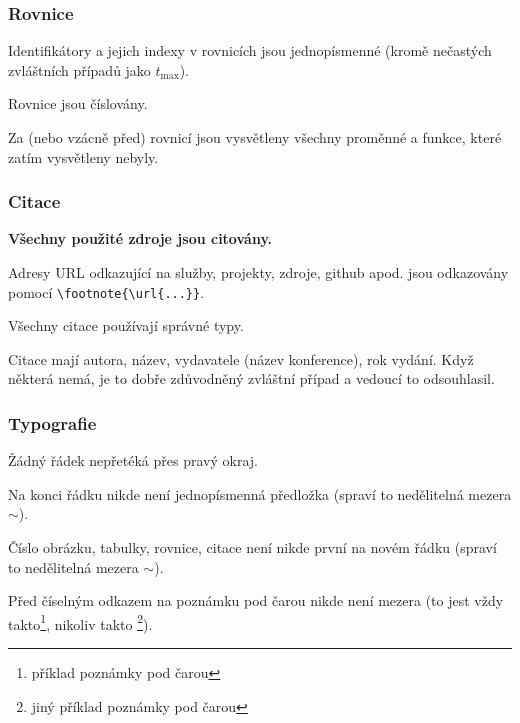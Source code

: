\subsubsection*{Rovnice}
\begin{checklist}
	\item Identifikátory a jejich indexy v rovnicích jsou jednopísmenné (kromě nečastých zvláštních případů jako $t_\mathrm{max}$).
	\item Rovnice jsou číslovány.
	\item Za (nebo vzácně před) rovnicí jsou vysvětleny všechny proměnné a funkce, které zatím vysvětleny nebyly.
\end{checklist}

\subsubsection*{Citace}
\begin{checklist}
    \item \textbf{Všechny použité zdroje jsou citovány.}
	\item Adresy URL odkazující na služby, projekty, zdroje, github apod. jsou odkazovány pomocí \verb|\footnote{\url{...}}|.
    \item Všechny citace používají správné typy.
	\item Citace mají autora, název, vydavatele (název konference), rok vydání.  Když některá nemá, je to dobře zdůvodněný zvláštní případ a vedoucí to odsouhlasil.
\end{checklist}

\subsubsection*{Typografie}
\begin{checklist}
	\item Žádný řádek nepřetéká přes pravý okraj.
	\item Na konci řádku nikde není jednopísmenná předložka (spraví to nedělitelná mezera $\sim$).
	\item Číslo obrázku, tabulky, rovnice, citace není nikde první na novém řádku (spraví to nedělitelná mezera $\sim$).
	\item Před číselným odkazem na poznámku pod čarou nikde není mezera (to jest vždy takto\footnote{příklad poznámky pod čarou}, nikoliv takto \footnote{jiný příklad poznámky pod čarou}).
\end{checklist}

